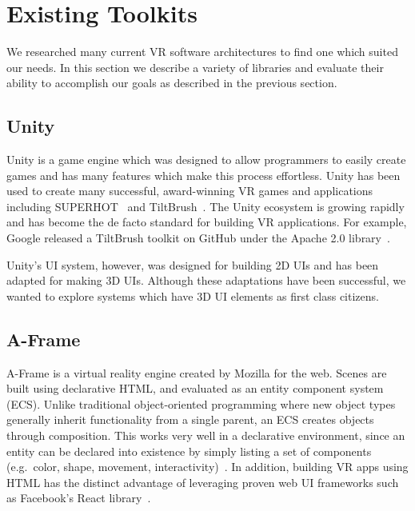 \documentclass[conference,12pt]{IEEEtran}
\begin{document}
\section{Existing Toolkits}\label{sec:existing_tools}

We researched many current VR software architectures to find one which suited
our needs. In this section we describe a variety of libraries and evaluate their
ability to accomplish our goals as described in the previous section.

\subsection{Unity}\label{sec:unity}

Unity is a game engine which was designed to allow programmers to easily create
games and has many features which make this process effortless. Unity has been
used to create many successful, award-winning VR games and applications
including SUPERHOT~\cite{UploadVR:SUPERHOT} and
TiltBrush~\cite{Unity:TiltBrush}. The Unity ecosystem is growing rapidly and has
become the de facto standard for building VR applications. For example, Google
released a TiltBrush toolkit on GitHub under the Apache 2.0
library~\cite{Google:TiltBrush}.

Unity's UI system, however, was designed for building 2D UIs and has been
adapted for making 3D UIs. Although these adaptations have been successful, we
wanted to explore systems which have 3D UI elements as first class citizens.


\subsection{A-Frame}\label{sec:aframe}

A-Frame is a virtual reality engine created by Mozilla for the web. Scenes are
built using declarative HTML, and evaluated as an entity component system (ECS).
Unlike traditional object-oriented programming where new object types generally
inherit functionality from a single parent, an ECS creates objects through
composition. This works very well in a declarative environment, since an entity
can be declared into existence by simply listing a set of components (e.g.\
color, shape, movement,
interactivity)~\cite{Mozilla-Hacks:2016:Building-A-Frame}. In addition, building
VR apps using HTML has the distinct advantage of leveraging proven web UI
frameworks such as Facebook's React library~\cite{Ngo:2017:AFrame:React}.
\end{document}
